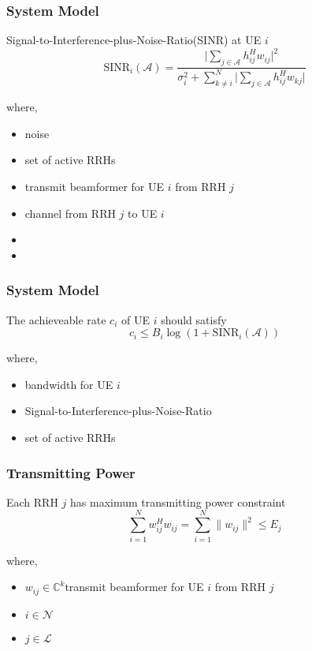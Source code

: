 \documentclass[usenames,dvipsnames]{beamer}
\begin{document}
\begin{frame}
  \frametitle{System Model}
  \begin{exampleblock}{Signal-to-Interference-plus-Noise-Ratio(SINR) at UE $i$}
    \[
      \text{SINR}_{i}(\mathcal{A}) = \frac{\bigg\lvert\sum\limits_{j\in{\mathcal{A}}}^{}h_{ij}^{H}w_{ij}\bigg\rvert^2}{\sigma_{i}^2 + \sum\limits_{k\neq i}^{N}\bigg\lvert\sum\limits_{j\in{\mathcal{A}}}^{}h_{ij}^{H}w_{kj}\bigg\rvert}
    \]
  \end{exampleblock}
  where,
  \begin{itemize}
    \item { noise}
    \item { set of active RRHs}
    \item { transmit beamformer for UE $i$ from RRH $j$}
    \item { channel from RRH $j$ to UE $i$}
    \item {}
    \item {}
    \end{itemize}
\end{frame}
\begin{frame}
  \frametitle{System Model}
  \begin{exampleblock}{The achieveable rate $c_{i}$ of UE $i$ should satisfy}
    \[
      c_{i} \leq B_{i}\log(1+\text{SINR}_{i}(\mathcal{A})) 
    \] 
  \end{exampleblock}
  where,
  \begin{itemize}
    \item { bandwidth for UE $i$}
    \item { Signal-to-Interference-plus-Noise-Ratio}
    \item { set of active RRHs}
  \end{itemize}
\end{frame}
\begin{frame}
  \frametitle{Transmitting Power}
  \begin{exampleblock}{Each RRH $j$ has maximum transmitting power constraint}
    \[
      \sum_{i = 1}^{N}w_{ij}^{H}w_{ij}  = \sum_{i = 1}^{N} \lVert w_{ij}\rVert^2 \leq E_{j}
    \]
  \end{exampleblock}
  where,
  \begin{itemize}
    \item $w_{ij}\in\mathbb{C}^{k}$\quad transmit beamformer for UE $i$ from RRH $j$
    \item $i\in\mathcal{N}$
    \item $j\in\mathcal{L}$
  \end{itemize}
\end{frame}
\end{document}
